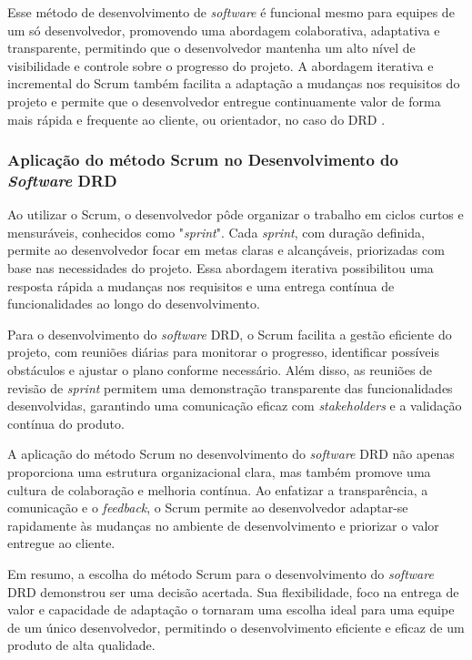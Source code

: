Esse método de desenvolvimento de \textit{software} é funcional mesmo para equipes de um só desenvolvedor, promovendo uma abordagem colaborativa, adaptativa e transparente, permitindo que o desenvolvedor mantenha um alto nível de visibilidade e controle sobre o progresso do projeto. A abordagem iterativa e incremental do Scrum também facilita a adaptação a mudanças nos requisitos do projeto e permite que o desenvolvedor entregue continuamente valor de forma mais rápida e frequente ao cliente, ou orientador, no caso do DRD \cite{scrum}.
        
\subsubsection{Aplicação do método Scrum no Desenvolvimento do \textit{Software} DRD}

Ao utilizar o Scrum, o desenvolvedor pôde organizar o trabalho em ciclos curtos e mensuráveis, conhecidos como "\textit{sprint}". Cada \textit{sprint}, com duração definida, permite ao desenvolvedor focar em metas claras e alcançáveis, priorizadas com base nas necessidades do projeto. Essa abordagem iterativa possibilitou uma resposta rápida a mudanças nos requisitos e uma entrega contínua de funcionalidades ao longo do desenvolvimento.
        
Para o desenvolvimento do \textit{software} DRD, o Scrum facilita a gestão eficiente do projeto, com reuniões diárias para monitorar o progresso, identificar possíveis obstáculos e ajustar o plano conforme necessário. Além disso, as reuniões de revisão de \textit{sprint} permitem uma demonstração transparente das funcionalidades desenvolvidas, garantindo uma comunicação eficaz com \textit{stakeholders} e a validação contínua do produto.
        
A aplicação do método Scrum no desenvolvimento do \textit{software} DRD não apenas proporciona uma estrutura organizacional clara, mas também promove uma cultura de colaboração e melhoria contínua. Ao enfatizar a transparência, a comunicação e o \textit{feedback}, o Scrum permite ao desenvolvedor adaptar-se rapidamente às mudanças no ambiente de desenvolvimento e priorizar o valor entregue ao cliente.
        
Em resumo, a escolha do método Scrum para o desenvolvimento do \textit{software} DRD demonstrou ser uma decisão acertada. Sua flexibilidade, foco na entrega de valor e capacidade de adaptação o tornaram uma escolha ideal para uma equipe de um único desenvolvedor, permitindo o desenvolvimento eficiente e eficaz de um produto de alta qualidade.
        
